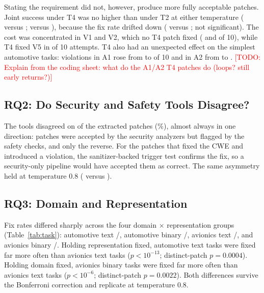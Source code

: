 \documentclass[12pt]{IEEEtran}
\newcommand{\todo}[1]{\textcolor{red}{[TODO: #1]}}
\begin{document}
Stating the requirement did not, however, produce more fully acceptable patches. Joint success under T4 was no higher than under T2 at either temperature ( versus ;  versus ), because the fix rate drifted down ( versus ; not significant). The cost was concentrated in V1 and V2, which no T4 patch fixed ( and  of 10), while T4 fixed V5 in  of 10 attempts. T4 also had an unexpected effect on the simplest automotive tasks: violations in A1 rose from  to  of 10 and in A2 from  to . \todo{Explain from the coding sheet: what do the A1/A2 T4 patches do (loops? still early returns?)}

\subsection{RQ2: Do Security and Safety Tools Disagree?}
The tools disagreed on  of the  extracted patches (\%), almost always in one direction:  patches were accepted by the security analyzers but flagged by the safety checks, and only  the reverse. For the  patches that fixed the CWE and introduced a violation, the sanitizer-backed trigger test confirms the fix, so a security-only pipeline would have accepted them as correct. The same asymmetry held at temperature 0.8 ( versus ).

\subsection{RQ3: Domain and Representation}
Fix rates differed sharply across the four domain $\times$ representation groups (Table~\ref{tab:task}): automotive text /, automotive binary /, avionics text /, and avionics binary /. Holding representation fixed, automotive text tasks were fixed far more often than avionics text tasks ($p < 10^{-13}$; distinct-patch $p = 0.0004$). Holding domain fixed, avionics binary tasks were fixed far more often than avionics text tasks ($p < 10^{-6}$; distinct-patch $p = 0.0022$). Both differences survive the Bonferroni correction and replicate at temperature 0.8.
\end{document}
